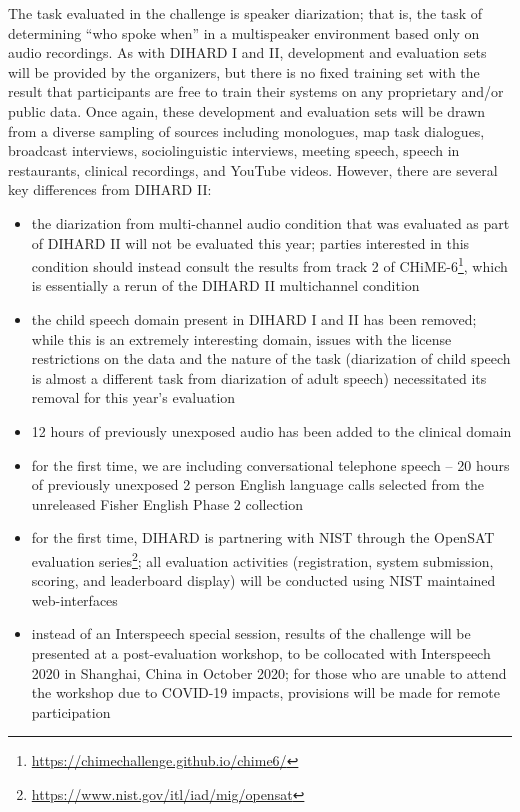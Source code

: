 \documentclass{article}
\begin{document}
The task evaluated in the challenge is speaker diarization; that is, the task of determining ``who spoke when'' in a multispeaker environment based only on audio recordings. As with DIHARD I and II, development and evaluation sets will be provided by the organizers, but there is no fixed training set with the result that participants are free to train their systems on any proprietary and/or public data. Once again, these development and evaluation sets will be drawn from a diverse sampling of sources including monologues, map task dialogues, broadcast interviews, sociolinguistic interviews, meeting speech, speech in restaurants, clinical recordings, and YouTube videos. However, there are several key differences from DIHARD II:
    \begin{itemize}
        \item the diarization from multi-channel audio condition that was evaluated as part of DIHARD II will not be evaluated this year; parties interested in this condition should instead consult the results from track 2 of CHiME-6\footnote{\url{https://chimechallenge.github.io/chime6/}}, which is essentially  a rerun of the DIHARD II multichannel condition
        \item the child speech domain present in DIHARD I and II has been removed; while this is an extremely interesting domain, issues with the license restrictions on the data and the nature of the task (diarization of child speech is almost a different task from diarization of adult speech) necessitated its removal for this year's evaluation
        \item 12 hours of previously unexposed audio has been added to the clinical domain
        \item for the first time, we are including conversational telephone speech  --  20 hours of previously unexposed 2 person English language calls selected from the unreleased Fisher English Phase 2 collection
        \item for the first time, DIHARD is partnering with NIST through the OpenSAT evaluation series\footnote{\url{https://www.nist.gov/itl/iad/mig/opensat}}; all evaluation activities (registration, system submission, scoring, and leaderboard display) will be conducted using NIST maintained web-interfaces
        \item instead of an Interspeech special session, results of the challenge will be presented at a post-evaluation workshop, to be collocated with Interspeech 2020 in Shanghai, China in October 2020; for those who are unable to attend the workshop due to COVID-19 impacts, provisions will be made for remote participation
    \end{itemize}
\end{document}
